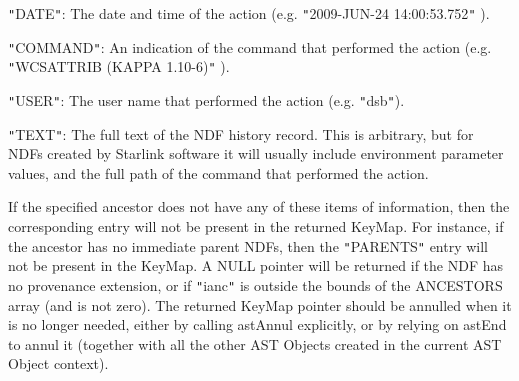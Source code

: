 \documentclass[twoside,11pt,nolof]{starlink}
\begin{document}
{{{{{            \sstitem
            \texttt{"}DATE\texttt{"}: The date and time of the action (e.g. \texttt{"}2009-JUN-24
              14:00:53.752\texttt{"} ).

            \sstitem
            \texttt{"}COMMAND\texttt{"}: An indication of the command that performed the
              action (e.g. \texttt{"}WCSATTRIB (KAPPA 1.10-6)\texttt{"} ).

            \sstitem
            \texttt{"}USER\texttt{"}: The user name that performed the action (e.g. \texttt{"}dsb\texttt{"}).

            \sstitem
            \texttt{"}TEXT\texttt{"}: The full text of the NDF history record. This is
              arbitrary, but for NDFs created by Starlink software it will
              usually include environment parameter values, and the full
              path of the command that performed the action.
         }
       }
         If the specified ancestor does not have any of these items of
         information, then the corresponding entry will not be present
         in the returned KeyMap. For instance, if the ancestor has no
         immediate parent NDFs, then the \texttt{"}PARENTS\texttt{"} entry will not be
         present in the KeyMap. A NULL pointer will be returned if the
         NDF has no provenance extension, or if \texttt{"}ianc\texttt{"} is outside the
         bounds of the ANCESTORS array (and is not zero). The returned
         KeyMap pointer should be annulled when it is no longer needed,
         either by calling astAnnul explicitly, or by relying on astEnd
         to annul it (together with all the other AST Objects created in
         the current AST Object context).
      }
   }
}
\end{document}
